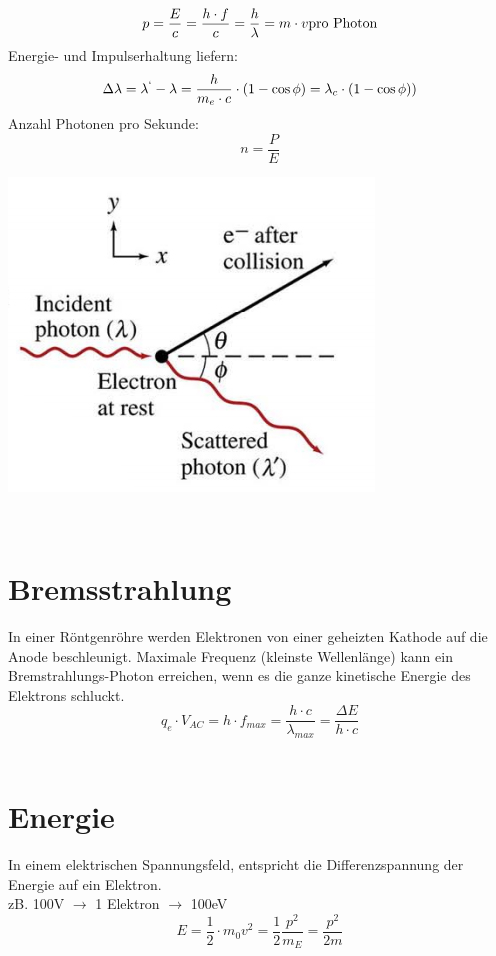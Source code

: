 \[
	p=\frac{E}{c}=\frac{h\cdot f}{c}= \frac{h}{\lambda}=m\cdot v \\ \text{pro Photon} \\ \\
\]
Energie- und Impulserhaltung liefern:
\[
	\Delta\lambda = \lambda^` -\lambda=\frac{h}{m_e\cdot c}\cdot \left( 1- \cos \phi  \right) = \lambda_c \cdot \left( 1- \cos \phi   \right) )
\]
Anzahl Photonen pro Sekunde:
\[
	n=\frac{P}{E}
\]
\begin{center}
	\includegraphics[scale = 0.3]{../fig/impuls_photon.jpg}
\end{center}
\
\section{Bremsstrahlung}
In einer Röntgenröhre werden Elektronen von einer geheizten  Kathode auf die Anode beschleunigt. Maximale Frequenz (kleinste Wellenlänge) kann ein Bremstrahlungs-Photon erreichen, wenn es die ganze kinetische Energie des Elektrons schluckt.\
\[
	q_e\cdot V_{AC} = h\cdot f_{max} = \frac{h\cdot c}{\lambda_{max}}=\frac{\Delta E}{h\cdot c}
\]
\\
\section{Energie}
In einem elektrischen Spannungsfeld, entspricht die Differenzspannung der Energie auf ein Elektron.\\
zB. 100V $\rightarrow$ 1 Elektron $\rightarrow$ 100eV
\[
	E= \frac{1}{2}\cdot m_0  v^2 = \frac{1}{2} \frac{p^2}{m_E}=\frac{p^2}{2m}
\]
\\
